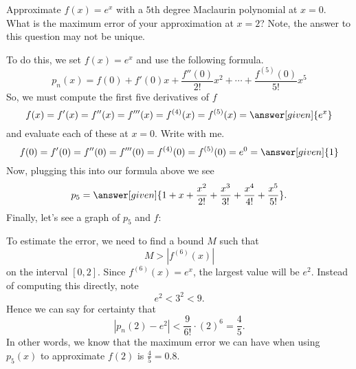 \documentclass{ximera}
\begin{document}
\begin{example}
  Approximate $f(x) = e^x$ with a $5$th degree Maclaurin polynomial at
  $x = 0$.  What is the maximum error of your approximation at $x=2$?
  Note, the answer to this question may not be unique.
  \begin{explanation}
    To do this, we set $f(x) =e^x$ and use the following formula.
    \[
    p_n(x) = f(0) + f'(0)x +\frac{f''(0)}{2!}x^2+\cdots +\frac{f^{(5)}(0)}{5!}x^5
    \]
    So, we must compute the first five derivatives of $f$
    \[
      f(x) = f'(x) = f''(x) = f'''(x) = f^{(4)}(x)  = f^{(5)}(x) = \answer[given]{e^x}
    \]
    and evaluate each of these at $x=0$. Write with me.
    \[
    f(0) = f'(0) = f''(0) = f'''(0) = f^{(4)}(0)  = f^{(5)}(0) = e^0 = \answer[given]{1}
    \]
    Now, plugging this into our formula above we see
    \[
    p_5 = \answer[given]{1 + x + \frac{x^2}{2!} + \frac{x^3}{3!} + \frac{x^4}{4!} + \frac{x^5}{5!}}.
    \]
    Finally, let's see a graph of $p_5$ and $f$:
      \begin{image}
      \end{image}
      To estimate the error, we need to find a bound $M$ such that
      \[
      M >|f^{(6)}(x)|
      \]
      on the interval $[0,2]$. Since $f^{(6)}(x) = e^x$, the largest
      value will be $e^2$. Instead of computing this directly, note
      \[
      e^2 < 3^2< 9.
      \]
      Hence we can say for certainty that
      \[
      |p_n(2) - e^2| < \frac{9}{6!}\cdot(2)^6 = \frac{4}{5}.
      \]
      In other words, we know that the maximum error we can have when using 
      $p_5(x)$ to approximate $f(2)$ is $\frac{4}{5} = 0.8$.
  \end{explanation}
\end{example}
\end{document}
